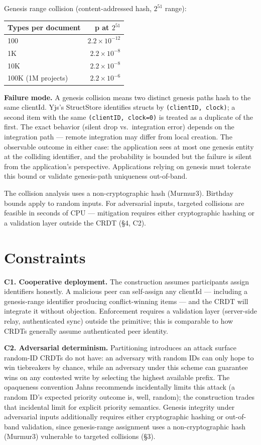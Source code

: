 Genesis range collision (content-addressed hash, $2^{51}$ range):

\begin{tabularx}{\linewidth}{@{}Xr@{}}
\toprule
\textbf{Types per document} & \textbf{p at $2^{51}$} \\
\midrule
100 & $2.2\times 10^{-12}$ \\
1K & $2.2\times 10^{-8}$ \\
10K & $2.2\times 10^{-8}$ \\
100K (1M projects) & $2.2\times 10^{-6}$ \\
\bottomrule
\end{tabularx}

\textbf{Failure mode.} A genesis collision means two distinct genesis paths hash to the same clientId. Yjs's StructStore identifies structs by \texttt{(clientID, clock)}; a second item with the same \texttt{(clientID, clock=0)} is treated as a duplicate of the first. The exact behavior (silent drop vs.\ integration error) depends on the integration path --- remote integration may differ from local creation. The observable outcome in either case: the application sees at most one genesis entity at the colliding identifier, and the probability is bounded but the failure is silent from the application's perspective. Applications relying on genesis must tolerate this bound or validate genesis-path uniqueness out-of-band.

The collision analysis uses a non-cryptographic hash (Murmur3). Birthday bounds apply to random inputs. For adversarial inputs, targeted collisions are feasible in seconds of CPU --- mitigation requires either cryptographic hashing or a validation layer outside the CRDT (§4, C2).

\section{Constraints}

\textbf{C1. Cooperative deployment.} The construction assumes participants assign identifiers honestly. A malicious peer can self-assign any clientId --- including a genesis-range identifier producing conflict-winning items --- and the CRDT will integrate it without objection. Enforcement requires a validation layer (server-side relay, authenticated sync) outside the primitive; this is comparable to how CRDTs generally assume authenticated peer identity.

\textbf{C2. Adversarial determinism.} Partitioning introduces an attack surface random-ID CRDTs do not have: an adversary with random IDs can only hope to win tiebreakers by chance, while an adversary under this scheme can guarantee wins on any contested write by selecting the highest available prefix. The opaqueness convention Jahns recommends\cite{jahns2020clientid} incidentally limits this attack (a random ID's expected priority outcome is, well, random); the construction trades that incidental limit for explicit priority semantics. Genesis integrity under adversarial inputs additionally requires either cryptographic hashing or out-of-band validation, since genesis-range assignment uses a non-cryptographic hash (Murmur3) vulnerable to targeted collisions (§3).

